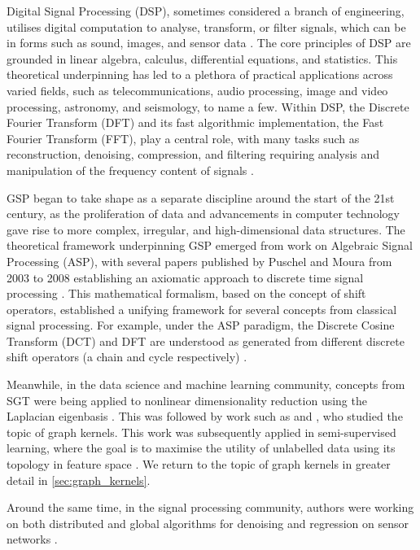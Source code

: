 Digital Signal Processing (DSP), sometimes considered a branch of engineering, utilises digital computation to analyse, transform, or filter signals, which can be in forms such as sound, images, and sensor data \citep{Rabiner1975}. The core principles of DSP are grounded in linear algebra, calculus, differential equations, and statistics. This theoretical underpinning has led to a plethora of practical applications across varied fields, such as telecommunications, audio processing, image and video processing, astronomy, and seismology, to name a few. Within DSP, the Discrete Fourier Transform (DFT) and its fast algorithmic implementation, the Fast Fourier Transform (FFT), play a central role, with many tasks such as reconstruction, denoising, compression, and filtering requiring analysis and manipulation of the frequency content of signals \citep{Duhamel1990}.

GSP began to take shape as a separate discipline around the start of the 21st century, as the proliferation of data and advancements in computer technology gave rise to more complex, irregular, and high-dimensional data structures. The theoretical framework underpinning GSP emerged from work on Algebraic Signal Processing (ASP), with several papers published by Puschel and Moura from 2003 to 2008 establishing an axiomatic approach to discrete time signal processing \citep{Puschel2003,Puschel2006,Puschel2008}. This mathematical formalism, based on the concept of shift operators, established a unifying framework for several concepts from classical signal processing. For example, under the ASP paradigm, the Discrete Cosine Transform (DCT) and DFT are understood as generated from different discrete shift operators (a chain and cycle respectively) \citep{Isufi2022}. 

Meanwhile, in the data science and machine learning community, concepts from SGT were being applied to nonlinear dimensionality reduction using the Laplacian eigenbasis \citep{Roweis2000,Belkin2003,Donoho2003}. This was followed by work such as \cite{Kondor2002}
and \cite{Smola2003}, who studied the topic of graph kernels. This work was subsequently applied in semi-supervised learning, where the goal is to maximise the utility of unlabelled data using its topology in feature space \citep{Belkin2004,Zhou2004,Zhu2003}. We return to the topic of graph kernels in greater detail in \cref{sec:graph_kernels}. 

Around the same time, in the signal processing community, authors were working on both distributed and global algorithms for denoising and regression on sensor networks \cite{Guestrin2004,Wagner2005,Wagner2006}. 


